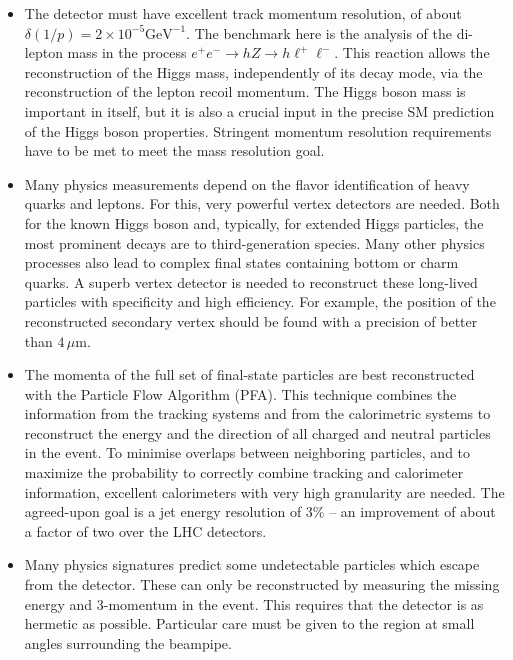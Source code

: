 \documentclass[%
 reprint,
 amsmath,amssymb,
 aps,
]{revtex4-1}
\def\ee{e^+e^-}
\begin{document}
 
\begin{itemize}
 \item The detector must have excellent track momentum
   resolution, of about $\delta(1/p)=2 \times 10^{-5} \mathrm{GeV}^{-1}$. 
The benchmark  here is the analysis 
of the di-lepton mass in the process $\ee \to hZ \to h \ell^+
\ell^-$. This reaction allows the reconstruction of the 
Higgs mass,  independently of its decay mode,  via the 
reconstruction of the lepton recoil momentum. The Higgs boson mass is
important in itself, but it is also a crucial input in the precise SM
prediction of the Higgs boson properties.  Stringent momentum resolution requirements have to be met
to meet the mass resolution goal. 
\item Many physics measurements depend on the flavor  identification of heavy
  quarks
and leptons.  For this, very powerful vertex detectors 
are needed. Both for the known Higgs boson and, typically, for 
extended Higgs particles, the most prominent decays are to
third-generation
species.   Many other physics processes also lead to 
complex  final states containing  bottom or charm quarks.
A superb  vertex detector  is needed to reconstruct these 
long-lived particles with specificity and high efficiency.
 For example, the position of the reconstructed secondary
 vertex
 should be found with a precision of better than $4\,\mu$m.
\item The momenta of the full set of final-state particles are
 best reconstructed with the 
Particle Flow Algorithm (PFA).
 This  technique combines 
the information from the tracking systems and from the 
calorimetric systems to reconstruct the 
energy and the direction of all charged and 
neutral particles in the event. To minimise overlaps between 
neighboring particles, and to 
maximize the probability to 
correctly combine tracking and calorimeter information, 
excellent calorimeters with very high granularity  are needed.
The agreed-upon goal is  a jet energy resolution of $3 \%$ -- an
improvement of about a 
factor of two over the LHC detectors. 
\item Many physics signatures predict some undetectable particles
which escape from the detector. These  can only be reconstructed by 
measuring the missing energy and 3-momentum  in the event. This requires 
that the detector is as hermetic as possible. 
Particular care must be given to the region at small angles surrounding the 
beampipe.
\end{itemize}
\end{document}
